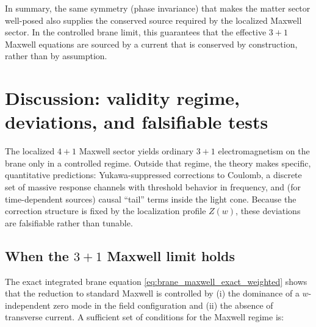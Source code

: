 \documentclass[11pt]{article}
\newcommand{\Z}{Z}
\begin{document}
In summary, the same symmetry (phase invariance) that makes the matter sector
well-posed also supplies the conserved source required by the localized Maxwell
sector. In the controlled brane limit, this guarantees that the effective \(3+1\)
Maxwell equations are sourced by a current that is conserved by construction,
rather than by assumption.

\section{Discussion: validity regime, deviations, and falsifiable tests}
\label{sec:discussion}

The localized \(4+1\) Maxwell sector yields ordinary \(3+1\) electromagnetism on
the brane only in a controlled regime. Outside that regime, the theory makes
specific, quantitative predictions: Yukawa-suppressed corrections to Coulomb, a
discrete set of massive response channels with threshold behavior in frequency,
and (for time-dependent sources) causal ``tail'' terms inside the light cone.
Because the correction structure is fixed by the localization profile \(\Z(w)\),
these deviations are falsifiable rather than tunable.

\subsection{When the \(3+1\) Maxwell limit holds}
The exact integrated brane equation \cref{eq:brane_maxwell_exact_weighted} shows
that the reduction to standard Maxwell is controlled by (i) the dominance of a
\(w\)-independent zero mode in the field configuration and (ii) the absence of
transverse current. A sufficient set of conditions for the Maxwell regime is:
\end{document}
